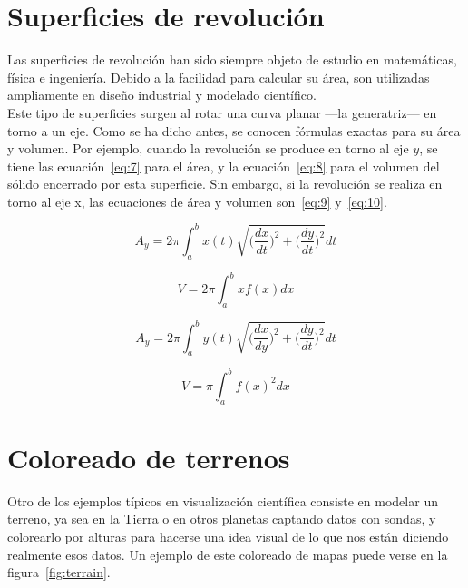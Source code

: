 \section{Superficies de revolución}
\label{ref:revolution}

Las superficies de revolución han sido siempre objeto de estudio en matemáticas,
física e ingeniería. Debido a la facilidad para calcular su área, son utilizadas
ampliamente en diseño industrial y modelado científico.\\

Este tipo de superficies surgen al rotar una curva planar ---la generatriz--- en
torno a un eje. Como se ha dicho antes, se conocen fórmulas exactas para su área
y volumen. Por ejemplo, cuando la revolución se produce en torno al eje $y$, se
tiene las ecuación~\eqref{eq:7} para el área, y la ecuación~\eqref{eq:8} para el
volumen del sólido encerrado por esta superficie. Sin embargo, si la revolución
se realiza en torno al eje x, las ecuaciones de área y volumen son~\eqref{eq:9}
y~\eqref{eq:10}.

\begin{equation} 
	A_y = 2\pi\int_{a}^{b}{x(t)\sqrt{\Big(\frac{dx}{dt}\Big)^2 +
		\Big(\frac{dy}{dt}\Big)^2}dt} \label{eq:7} 
\end{equation}

\begin{equation} 
		V = 2\pi\int_{a}^{b}{xf(x) dx} \label{eq:8} 
\end{equation}

\begin{equation} 
	A_y = 2\pi\int_{a}^{b}{y(t)\sqrt{\Big(\frac{dx}{dy}\Big)^2 +
		\Big(\frac{dy}{dt}\Big)^2}dt} \label{eq:9} 
\end{equation}

\begin{equation} 
		V = \pi\int_{a}^{b}{f(x)^2 dx} \label{eq:10} 
\end{equation}

\section{Coloreado de terrenos}
\label{ref:terrain}

Otro de los ejemplos típicos en visualización científica consiste en modelar un
terreno, ya sea en la Tierra o en otros planetas captando datos con sondas, y
colorearlo por alturas para hacerse una idea visual de lo que nos están diciendo
realmente esos datos. Un ejemplo de este coloreado de mapas puede verse en la
figura~\ref{fig:terrain}.

